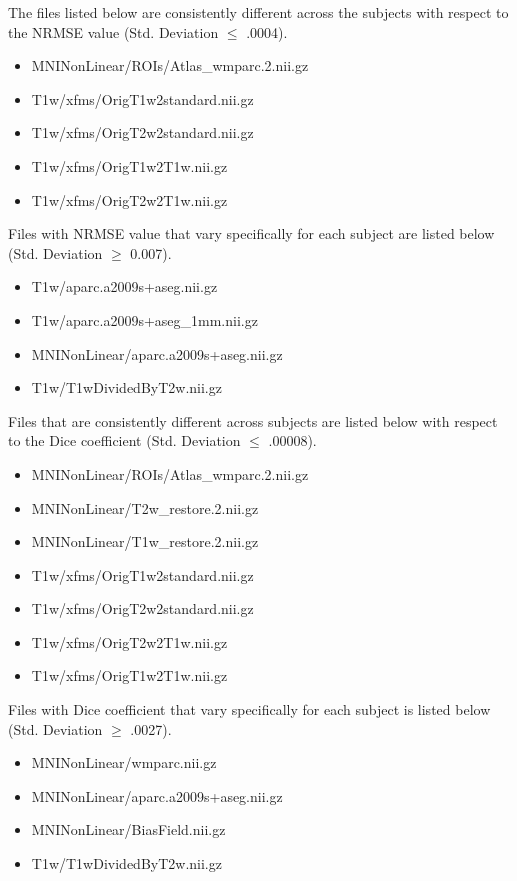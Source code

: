 The files listed below are consistently different across the subjects with respect to the NRMSE value (Std. Deviation $\leq$ .0004).
\begin{itemize}
  \item MNINonLinear/ROIs/Atlas\_wmparc.2.nii.gz
  \item T1w/xfms/OrigT1w2standard.nii.gz
  \item T1w/xfms/OrigT2w2standard.nii.gz
  \item T1w/xfms/OrigT1w2T1w.nii.gz
  \item T1w/xfms/OrigT2w2T1w.nii.gz
\end{itemize}

Files with NRMSE value that vary specifically for each subject are listed below (Std. Deviation $\geq$ 0.007).
\begin{itemize}
  \item T1w/aparc.a2009s+aseg.nii.gz
  \item T1w/aparc.a2009s+aseg\_1mm.nii.gz
  \item MNINonLinear/aparc.a2009s+aseg.nii.gz
  \item T1w/T1wDividedByT2w.nii.gz
\end{itemize}

Files that are consistently different across subjects are listed below with respect to the Dice coefficient (Std. Deviation $\leq$ .00008).
\begin{itemize}
  \item MNINonLinear/ROIs/Atlas\_wmparc.2.nii.gz
  \item MNINonLinear/T2w\_restore.2.nii.gz
  \item MNINonLinear/T1w\_restore.2.nii.gz
  \item T1w/xfms/OrigT1w2standard.nii.gz
  \item T1w/xfms/OrigT2w2standard.nii.gz
  \item T1w/xfms/OrigT2w2T1w.nii.gz
  \item T1w/xfms/OrigT1w2T1w.nii.gz
\end{itemize}

Files with Dice coefficient that vary specifically for each subject is listed below (Std. Deviation $\geq$ .0027).
\begin{itemize}
  \item MNINonLinear/wmparc.nii.gz
  \item MNINonLinear/aparc.a2009s+aseg.nii.gz
  \item MNINonLinear/BiasField.nii.gz
  \item T1w/T1wDividedByT2w.nii.gz
\end{itemize}
\hfill \break

